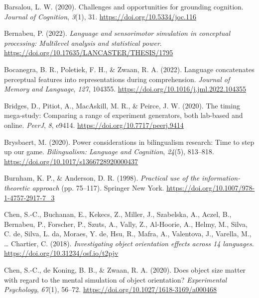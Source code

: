 \documentclass[
  man,floatsintext]{apa7}
\newlength{\cslhangindent}
\newlength{\cslentryspacingunit} %
\newenvironment{CSLReferences}[2] %
 {%
  \setlength{\parindent}{0pt}
  \ifodd #1
  \let\oldpar\par
  \def\par{\hangindent=\cslhangindent\oldpar}
  \fi
  \setlength{\parskip}{#2\cslentryspacingunit}
 }%
 {}
\begin{document}
\begin{CSLReferences}{1}{0}
\leavevmode{}%
Barsalou, L. W. (2020). Challenges and opportunities for grounding cognition. \emph{Journal of Cognition}, \emph{3}(1), 31. \url{https://doi.org/10.5334/joc.116}

\leavevmode{}%
Bernabeu, P. (2022). \emph{Language and sensorimotor simulation in conceptual processing: Multilevel analysis and statistical power}. \url{https://doi.org/10.17635/LANCASTER/THESIS/1795}

\leavevmode{}%
Bocanegra, B. R., Poletiek, F. H., \& Zwaan, R. A. (2022). Language concatenates perceptual features into representations during comprehension. \emph{Journal of Memory and Language}, \emph{127}, 104355. \url{https://doi.org/10.1016/j.jml.2022.104355}

\leavevmode{}%
Bridges, D., Pitiot, A., MacAskill, M. R., \& Peirce, J. W. (2020). The timing mega-study: Comparing a range of experiment generators, both lab-based and online. \emph{PeerJ}, \emph{8}, e9414. \url{https://doi.org/10.7717/peerj.9414}

\leavevmode{}%
Brysbaert, M. (2020). Power considerations in bilingualism research: Time to step up our game. \emph{Bilingualism: Language and Cognition}, \emph{24}(5), 813--818. \url{https://doi.org/10.1017/s1366728920000437}

\leavevmode{}%
Burnham, K. P., \& Anderson, D. R. (1998). \emph{Practical use of the information-theoretic approach} (pp. 75--117). Springer New York. \url{https://doi.org/10.1007/978-1-4757-2917-7_3}

\leavevmode{}%
Chen, S.-C., Buchanan, E., Kekecs, Z., Miller, J., Szabelska, A., Aczel, B., Bernabeu, P., Forscher, P., Szuts, A., Vally, Z., Al-Hoorie, A., Helmy, M., Silva, C. de, Silva, L. da, Moraes, Y. de, Hsu, R., Mafra, A., Valentova, J., Varella, M., \ldots{} Chartier, C. (2018). \emph{Investigating object orientation effects across 14 languages}. \url{https://doi.org/10.31234/osf.io/t2pjv}

\leavevmode{}%
Chen, S.-C., de Koning, B. B., \& Zwaan, R. A. (2020). Does object size matter with regard to the mental simulation of object orientation? \emph{Experimental Psychology}, \emph{67}(1), 56--72. \url{https://doi.org/10.1027/1618-3169/a000468}


\end{CSLReferences}
\end{document}
